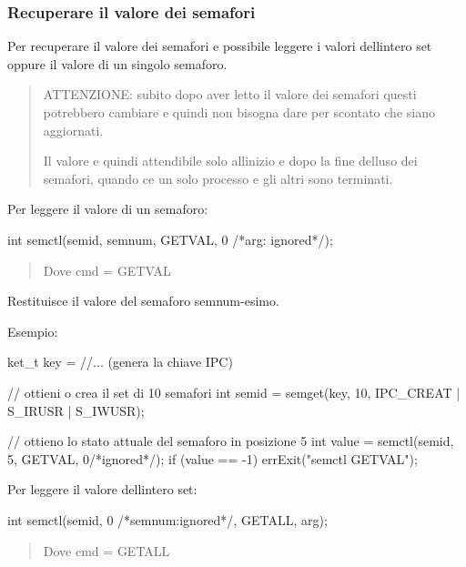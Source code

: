 \subsubsection*{Recuperare il valore dei semafori}

Per recuperare il valore dei semafori e\textquotesingle{} possibile leggere i valori dell\textquotesingle{}intero set oppure il valore di un singolo semaforo.

\begin{quote}
A\+T\+T\+E\+N\+Z\+I\+O\+NE\+: subito dopo aver letto il valore dei semafori questi potrebbero cambiare e quindi non bisogna dare per scontato che siano aggiornati.

Il valore e\textquotesingle{} quindi attendibile solo all\textquotesingle{}inizio e dopo la fine dell\textquotesingle{}uso dei semafori, quando c\textquotesingle{}e\textquotesingle{} un solo processo e gli altri sono terminati. \end{quote}


Per leggere il valore di un semaforo\+: 
\begin{DoxyCode}
\textcolor{keywordtype}{int} semctl(semid, semnum, GETVAL, 0 \textcolor{comment}{/*arg: ignored*/});
\end{DoxyCode}
 \begin{quote}
Dove {\ttfamily cmd} = {\ttfamily G\+E\+T\+V\+AL} \end{quote}


Restituisce il valore del semaforo semnum-\/esimo.

Esempio\+: 
\begin{DoxyCode}
ket\_t key = \textcolor{comment}{//... (genera la chiave IPC)}

\textcolor{comment}{// ottieni o crea il set di 10 semafori}
\textcolor{keywordtype}{int} semid = semget(key, 10, IPC\_CREAT | S\_IRUSR | S\_IWUSR);

\textcolor{comment}{// ottieno lo stato attuale del semaforo in posizione 5}
\textcolor{keywordtype}{int} value = semctl(semid, 5, GETVAL, 0\textcolor{comment}{/*ignored*/});
\textcolor{keywordflow}{if} (value == -1)
    errExit(\textcolor{stringliteral}{"semctl GETVAL"});
\end{DoxyCode}


Per leggere il valore dell\textquotesingle{}intero set\+: 
\begin{DoxyCode}
\textcolor{keywordtype}{int} semctl(semid, 0 \textcolor{comment}{/*semnum:ignored*/}, GETALL, arg);
\end{DoxyCode}
 \begin{quote}
Dove {\ttfamily cmd} = {\ttfamily G\+E\+T\+A\+LL} \end{quote}


